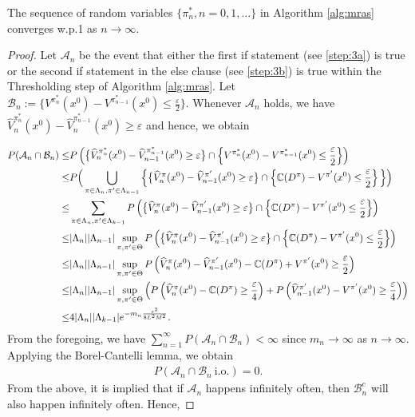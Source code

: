 \begin{lemma}\label{lemma:iofo}
    The sequence of random variables $\{\pi^*_n,n=0,1,\ldots \}$ in Algorithm \ref{alg:mras} converges w.p.1 as $n\rightarrow \infty$.
\end{lemma}
\begin{proof}
    Let $\mathcal{A}_n$ be the event that either the first if statement (see \ref{step:3a}) is true or the second if statement in the else clause (see \ref{step:3b}) is true within the Thresholding step of Algorithm \ref{alg:mras}. Let $\mathcal{B}_n:=\{V^{\pi^*_{n}}(x^0)-V^{\pi^*_{n-1}}(x^0)\leq \frac{\varepsilon}{2}\}$.
    Whenever $\mathcal{A}_n$ holds, we have $\widehat V_n^{\pi^*_{n}}(x^0)-\widehat V_n^{\pi^*_{n-1}}(x^0)\geq \varepsilon$ and hence, we obtain

\begin{align*}
P(\mathcal{A}_{n}\cap \mathcal{B}_n) \leq &
P 
\left(\big\{\widehat V_n^{\pi^*_{n}}(x^0)-\widehat V_{n-1}^{\pi^*_{n-1}}(x^0)\geq \varepsilon\big\} \cap \left\{V^{\pi^*_{n}}(x^0)-V^{\pi^*_{n-1}}(x^0)\leq \frac{\varepsilon}{2}\right\}\right)\\
 \leq &
P\Big(\bigcup_{\pi\in\Lambda_n, \pi'\in \Lambda_{n-1}} \Big\{\big\{\widehat V_n^{\pi}(x^0)-\widehat V_{n-1}^{\pi'}(x^0)\geq \varepsilon\big\} \cap \left\{\mathbb{C}(D^\pi)-V^{\pi'}(x^0)\leq \frac{\varepsilon}{2}\right\} \Big\}\Big)\\
\leq & \sum_{{\pi\in \Lambda_n},{\pi'\in \Lambda_{k-1}}}P\left(\big\{\widehat V_n^{\pi}(x^0)-\widehat V_{n-1}^{\pi'}(x^0)\geq \varepsilon\big\} \cap
\left\{\mathbb{C}(D^\pi)-V^{\pi'}(x^0)\leq \frac{\varepsilon}{2}\right\}\right) \\
\leq & |\Lambda_n||\Lambda_{n-1}|\sup_{\pi,\pi'\in \Theta}P\left(\big\{\widehat V_n^{\pi}(x^0)-\widehat V_{n-1}^{\pi'}(x^0)\geq \varepsilon\big\} \cap
\left\{\mathbb{C}(D^\pi)-V^{\pi'}(x^0)\leq \frac{\varepsilon}{2}\right\} \right) \\
\leq &|\Lambda_n||\Lambda_{n-1}|\sup_{\pi,\pi'\in \Theta}P\left(\widehat V_n^{\pi}(x^0)-\widehat V_{n-1}^{\pi'}(x^0)-\mathbb{C}(D^\pi)+V^{\pi'}(x^0)\geq \frac{\varepsilon}{2}\right) \\
\leq &|\Lambda_n||\Lambda_{n-1}|\sup_{\pi,\pi'\in \Theta}\left(P\left(\widehat V_n^{\pi}(x^0)-\mathbb{C}(D^\pi)\geq \frac{\varepsilon}{4}\right) + P\left(\widehat V_{n-1}^{\pi'}(x^0)-V^{\pi'}(x^0)\geq \frac{\varepsilon}{4}\right)\right) \\
\leq & 4|\Lambda_n||\Lambda_{k-1}|
 e^{-m_n \frac{\epsilon^2}{8 L^2 M^2}}.
\end{align*}
From the foregoing, we have $\sum_{n=1}^{\infty}P\left(\mathcal{A}_n \cap \mathcal{B}_n\right) < \infty$ since $m_n \rightarrow \infty$ as $n\rightarrow \infty$.  Applying the Borel-Cantelli lemma, we obtain
\begin{align*}
P\left(\mathcal{A}_n \cap \mathcal{B}_n~\mbox{i.o.} \right)=0.
\end{align*}
From the above, it is implied that if $\mathcal{A}_n$ happens infinitely often,
then $\mathcal{B}_n^c$ will also happen infinitely often. Hence,


\end{proof}

